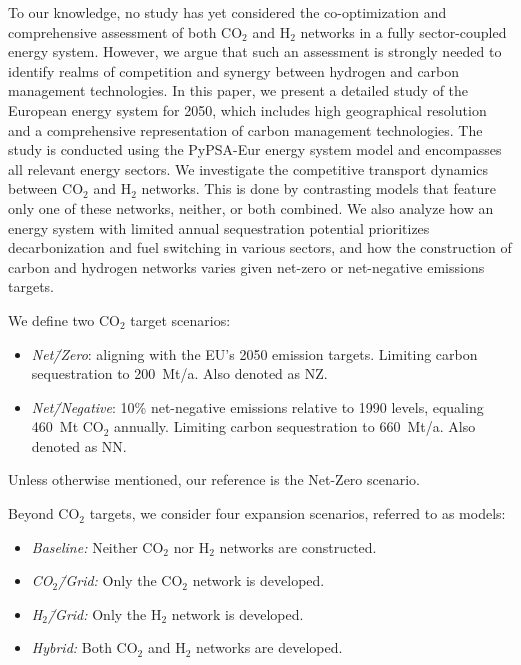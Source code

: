 \documentclass[twocolumn]{article}
\newcommand{\COtwo}{CO$_2$}
\newcommand{\Htwo}{H$_2$}
\newcommand{\COgrid}{CO$_2$\=/Grid}
\newcommand{\Hgrid}{H$_2$\=/Grid}
\begin{document}
To our knowledge, no study has yet considered the co-optimization and comprehensive assessment of both \COtwo{} and \Htwo{} networks in a fully sector-coupled energy system. However, we argue that such an assessment is strongly needed to identify realms of competition and synergy between hydrogen and carbon management technologies. In this paper, we present a detailed study of the European energy system for 2050, which includes high geographical resolution and a comprehensive representation of carbon management technologies. The study is conducted using the PyPSA-Eur energy system model and encompasses all relevant energy sectors. We investigate the competitive transport dynamics between \COtwo{} and \Htwo{} networks. This is done by contrasting models that feature only one of these networks, neither, or both combined. We also analyze how an energy system with limited annual sequestration potential prioritizes decarbonization and fuel switching in various sectors, and how the construction of carbon and hydrogen networks varies given net-zero or net-negative emissions targets.

We define two \COtwo{} target scenarios:
\begin{itemize}
    \item[] \textit{Net\=/Zero}: aligning with the EU's 2050 emission targets. Limiting carbon sequestration to 200~Mt/a. Also denoted as NZ.
    \item[] \textit{Net\=/Negative}: 10\% net-negative emissions relative to 1990 levels, equaling 460~Mt \COtwo{} annually. Limiting carbon sequestration to 660~Mt/a. Also denoted as NN.
\end{itemize}
Unless otherwise mentioned, our reference is the Net-Zero scenario.

Beyond \COtwo{} targets, we consider four expansion scenarios, referred to as models:
\begin{itemize}
    \item[] \textit{Baseline:} Neither \COtwo{} nor \Htwo{} networks are constructed.
    \item[] \textit{\COgrid{}:} Only the \COtwo{} network is developed.
    \item[] \textit{\Hgrid{}:} Only the \Htwo{} network is developed.
    \item[] \textit{Hybrid:} Both \COtwo{} and \Htwo{} networks are developed.
\end{itemize}

\end{document}
